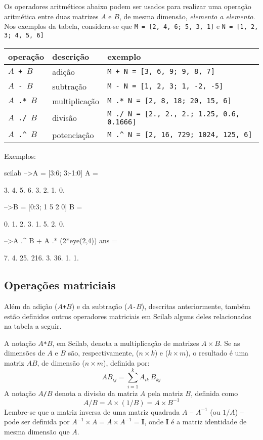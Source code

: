 \documentclass[11pt,fleqn]{practice}
\begin{document}
Os operadores aritméticos abaixo podem ser usados para realizar uma
operação aritmética entre duas matrizes $A$ e $B$, de mesma dimensão,
\emph{elemento a elemento}. Nos exemplos da tabela, considera-se que 
\texttt{M = [2, 4, 6; 5, 3, 1]} e \texttt{N = [1, 2, 3; 4, 5, 6]}  
\begin{center}
  \begin{tabular}{llp{9cm}} \hline
    \textbf{operação} & \textbf{descrição} & \textbf{exemplo}\\\hline
    \texttt{$A$ + $B$} & adição & \texttt{M + N = [3, 6, 9; 9, 8, 7]}\\\hline
    \texttt{$A$ - $B$} & subtração & \texttt{M - N = [1, 2, 3; 1, -2, -5]} \\\hline
    \texttt{$A$ .* $B$} & multiplicação & \texttt{M .* N = [2, 8, 18; 20, 15, 6]}\\\hline
    \texttt{$A$ ./ $B$} & divisão & \texttt{M ./ N = [2., 2., 2.; 1.25, 0.6, 0.1666]}\\\hline
    \texttt{$A$ .\textasciicircum\ $B$} & potenciação & \texttt{M .\textasciicircum\ N = [2, 16, 729; 1024, 125, 6]} \\\hline
  \end{tabular}
\end{center}

Exemplos:
\begin{lst}{scilab}
-->A = [3:6; 3:-1:0]
 A  =
 
    3.    4.    5.    6.  
    3.    2.    1.    0.  
 
-->B = [0:3; 1 5 2 0]
 B  =
 
    0.    1.    2.    3.  
    1.    5.    2.    0.  

-->A .^ B + A .* (2*eye(2,4))
 ans  =
 
    7.    4.     25.    216.  
    3.    36.    1.     1.    
\end{lst}

% 
% 

\subsection{Operações matriciais}

Além da adição (\texttt{$A$+$B$}) e da subtração (\texttt{$A$-$B$}), descritas anteriormente, também estão definidos outros operadores matriciais em Scilab alguns deles relacionados na tabela a seguir. 

A notação \texttt{$A$*$B$}, em Scilab, denota a multiplicação de matrizes $A\times B$. Se as dimensões de $A$ e $B$ são, respectivamente,  ($n\times k$)  e ($k \times m$), o resultado é uma matriz $AB$, de dimensão ($n\times m$), definida por:
\[ AB_{ij} = \sum_{i=1}^k A_{ik}\, B_{kj} \]
A notação \texttt{$A$/$B$} denota a divisão da matriz $A$ pela matriz $B$, definida como
 \[ \texttt{$A$/$B$} = A \times  (1/B) = A \times B^{-1} \]
Lembre-se que a matriz inversa de uma matriz quadrada $A$ -- $A^{-1}$ (ou $1/A$) -- pode ser definida por $A^{-1}\times A = A \times A^{-1} = \mathbf{I}$, onde $\mathbf{I}$ é a matriz identidade de mesma dimensão que $A$.
\end{document}
